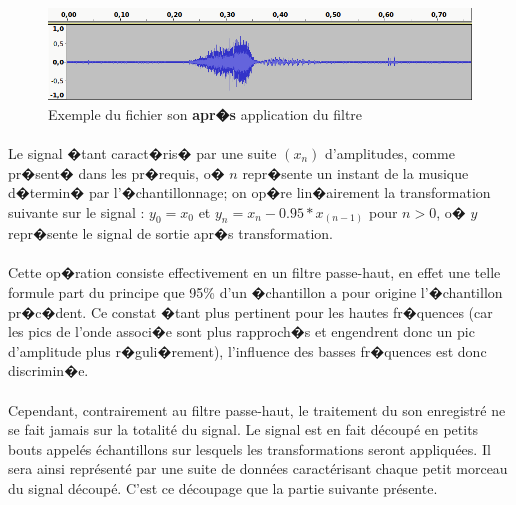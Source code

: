 \begin{figure}[H]
	    \begin{center}
		    \includegraphics[width=15cm]{Images/passehautapres.png} 
	    \end{center}
	    \caption{Exemple du fichier son \textbf{apr�s} application du filtre}
\end{figure}
\paragraph{}
	Le signal �tant caract�ris� par une suite $(x_n)$ 
	d'amplitudes, comme pr�sent� dans les pr�requis, o� $n$ repr�sente un instant de la musique d�termin� par l'�chantillonnage; 
	on op�re lin�airement la transformation suivante sur le signal : $y_0 = x_0$ et $y_n = x_n - 0.95*x_{(n-1)}$  pour $n > 0$, 
	o� $y$ repr�sente le signal de sortie apr�s transformation.
\paragraph{}
	Cette op�ration consiste effectivement en un filtre passe-haut, en effet une telle formule part du principe que 95\% d'un 
	�chantillon a pour origine l'�chantillon pr�c�dent. Ce constat �tant plus pertinent pour les hautes fr�quences (car les 
	pics de l'onde associ�e sont plus rapproch�s et engendrent donc un pic d'amplitude plus r�guli�rement), l'influence des basses fr�quences est donc discrimin�e. 
	
\paragraph{}
	Cependant, contrairement au filtre passe-haut, le traitement du son enregistré ne se fait jamais sur la totalité du signal. Le signal est en fait découpé en
	petits bouts appelés échantillons sur lesquels les transformations seront appliquées. Il sera ainsi représenté par une suite de données caractérisant chaque 
	petit morceau du signal découpé. C'est ce découpage que la partie suivante présente.
        \newpage
        
